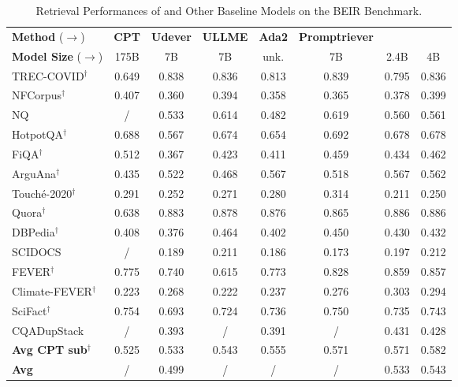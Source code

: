 \begin{table*}[t]
\centering
\small
\begin{tabular}{l|c|c|c|c|c|cc}
    \hline
    \textbf{Method} ($\rightarrow$) &\textbf{CPT}& \textbf{Udever} &  \textbf{ULLME} & \textbf{Ada2} & \textbf{Promptriever} & \multicolumn{2}{c}{\textbf{\method{}}} \\
    \textbf{Model Size} ($\rightarrow$) & 175B& 7B & 7B & unk. & 7B & 2.4B & 4B \\
    \hline
    TREC-COVID$^{\dagger}$  &0.649 &0.838 &0.836 &0.813 &0.839 & 0.795 & 0.836 \\
    NFCorpus$^{\dagger}$  &0.407 &0.360 &0.394 &0.358 &0.365 & 0.378 & 0.399 \\
    NQ &/ &0.533 &0.614 &0.482&0.619 &0.560 & 0.561 \\
    HotpotQA$^{\dagger}$  &0.688 &0.567 &0.674 &0.654 & 0.692&0.678 & 0.678 \\
    FiQA$^{\dagger}$  &0.512 &0.367 &0.423 &0.411 &0.459 & 0.434 & 0.462 \\
    ArguAna$^{\dagger}$  &0.435 &0.522 &0.468 &0.567 &0.518  & 0.567 & 0.562 \\
    Touché-2020$^{\dagger}$  &0.291 &0.252 &0.271 &0.280 &0.314 & 0.211 & 0.250 \\
    Quora$^{\dagger}$  &0.638 &0.883 &0.878 &0.876&0.865  & 0.886 & 0.886 \\
    DBPedia$^{\dagger}$  &0.408 &0.376 &0.464&0.402 &0.450 & 0.430 & 0.432 \\
    SCIDOCS &/ &0.189 &0.211 &0.186 &0.173  & 0.197 & 0.212 \\
    FEVER$^{\dagger}$  &0.775 &0.740 &0.615 & 0.773&0.828 & 0.859 & 0.857 \\
    Climate-FEVER$^{\dagger}$  &0.223 &0.268 &0.222 &0.237 &0.276 & 0.303 & 0.294 \\
    SciFact$^{\dagger}$  &0.754 &0.693 &0.724 &0.736 &0.750  & 0.735 & 0.743 \\
    CQADupStack &/ &0.393 &/ &0.391 & / & 0.431 & 0.428 \\
    \hline
    \textbf{Avg CPT sub$^{\dagger}$ } &0.525 &0.533 &0.543 &0.555 &0.571 &0.571&0.582\\
    \textbf{Avg} &/ &0.499 &/ &/ &/  &0.533 & 0.543 \\
    \hline
\end{tabular}
\caption{Retrieval Performances of \method{} and Other Baseline Models on the BEIR Benchmark.} 
\label{tab:other_baseline}
\end{table*}
